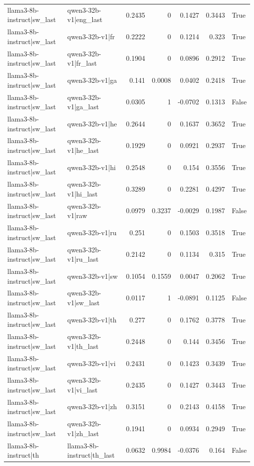 \begin{table}
\begin{tabular}{l l r r r r l}
llama3-8b-instruct|sw_last & qwen3-32b-v1|eng_last & 0.2435 & 0 & 0.1427 & 0.3443 & True \\
llama3-8b-instruct|sw_last & qwen3-32b-v1|fr & 0.2222 & 0 & 0.1214 & 0.323 & True \\
llama3-8b-instruct|sw_last & qwen3-32b-v1|fr_last & 0.1904 & 0 & 0.0896 & 0.2912 & True \\
llama3-8b-instruct|sw_last & qwen3-32b-v1|ga & 0.141 & 0.0008 & 0.0402 & 0.2418 & True \\
llama3-8b-instruct|sw_last & qwen3-32b-v1|ga_last & 0.0305 & 1 & -0.0702 & 0.1313 & False \\
llama3-8b-instruct|sw_last & qwen3-32b-v1|he & 0.2644 & 0 & 0.1637 & 0.3652 & True \\
llama3-8b-instruct|sw_last & qwen3-32b-v1|he_last & 0.1929 & 0 & 0.0921 & 0.2937 & True \\
llama3-8b-instruct|sw_last & qwen3-32b-v1|hi & 0.2548 & 0 & 0.154 & 0.3556 & True \\
llama3-8b-instruct|sw_last & qwen3-32b-v1|hi_last & 0.3289 & 0 & 0.2281 & 0.4297 & True \\
llama3-8b-instruct|sw_last & qwen3-32b-v1|raw & 0.0979 & 0.3237 & -0.0029 & 0.1987 & False \\
llama3-8b-instruct|sw_last & qwen3-32b-v1|ru & 0.251 & 0 & 0.1503 & 0.3518 & True \\
llama3-8b-instruct|sw_last & qwen3-32b-v1|ru_last & 0.2142 & 0 & 0.1134 & 0.315 & True \\
llama3-8b-instruct|sw_last & qwen3-32b-v1|sw & 0.1054 & 0.1559 & 0.0047 & 0.2062 & True \\
llama3-8b-instruct|sw_last & qwen3-32b-v1|sw_last & 0.0117 & 1 & -0.0891 & 0.1125 & False \\
llama3-8b-instruct|sw_last & qwen3-32b-v1|th & 0.277 & 0 & 0.1762 & 0.3778 & True \\
llama3-8b-instruct|sw_last & qwen3-32b-v1|th_last & 0.2448 & 0 & 0.144 & 0.3456 & True \\
llama3-8b-instruct|sw_last & qwen3-32b-v1|vi & 0.2431 & 0 & 0.1423 & 0.3439 & True \\
llama3-8b-instruct|sw_last & qwen3-32b-v1|vi_last & 0.2435 & 0 & 0.1427 & 0.3443 & True \\
llama3-8b-instruct|sw_last & qwen3-32b-v1|zh & 0.3151 & 0 & 0.2143 & 0.4158 & True \\
llama3-8b-instruct|sw_last & qwen3-32b-v1|zh_last & 0.1941 & 0 & 0.0934 & 0.2949 & True \\
llama3-8b-instruct|th & llama3-8b-instruct|th_last & 0.0632 & 0.9984 & -0.0376 & 0.164 & False \\

\end{tabular}
\end{table}
